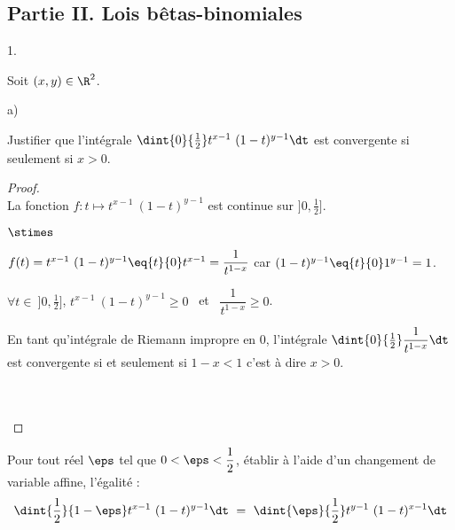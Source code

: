 \documentclass[11pt]{article}%
\begin{document}


\subsection*{Partie II. Lois bêtas-binomiales}

\begin{noliste}{1.}
  \setlength{\itemsep}{4mm} %
  \setcounter{enumi}{3}
\item Soit $(x,y) \in \R^2$.
  \begin{noliste}{a)}
    \setlength{\itemsep}{2mm}
  \item Justifier que l'intégrale $\dint{0}{\frac{1}{2}} t^{x-1} \
    (1-t)^{y-1} \dt$ est convergente si seulement si $x>0$.

    \begin{proof}~\\%
      La fonction $f : t \mapsto t^{x-1} \ (1-t)^{y-1}$ est continue
      sur $]0, \frac{1}{2}]$.
      \begin{noliste}{$\stimes$}
      \item $f(t) = t^{x-1} \ (1-t)^{y-1} \eq{t}{0} t^{x-1} =
        \dfrac{1}{t^{1-x}}$ \quad car \quad $(1-t)^{y-1} \eq{t}{0}
        1^{y-1} = 1$.
        
      \item $\forall t \in \ ]0, \frac{1}{2}]$, $t^{x-1} \ (1-t)^{y-1}
        \geq 0$ \ et \ $\dfrac{1}{t^{1-x}} \geq 0$.
        
      \item En tant qu'intégrale de Riemann impropre en $0$,
        l'intégrale $\dint{0}{\frac{1}{2}} \dfrac{1}{t^{1-x}} \dt$ est
        convergente si et seulement si $1 - x < 1$ c'est à dire $x >
        0$.
      \end{noliste}~\\[-1.4cm]
      ~\\[-1cm]
    \end{proof}
    
  \item Pour tout réel $\eps$ tel que $0 < \eps < \dfrac{1}{2}$,
    établir à l'aide d'un changement de variable affine, l'égalité :
    \[
    \dint{\frac{1}{2}}{1-\eps} t^{x-1} \ (1-t)^{y-1} \dt \ = \
    \dint{\eps}{\frac{1}{2}} t^{y-1} \ (1-t)^{x-1} \dt
    \]


\end{noliste}
\end{noliste}
\end{document}
